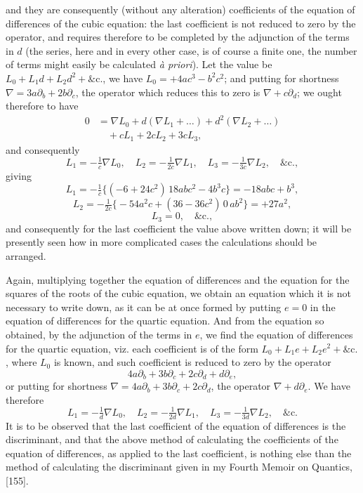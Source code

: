 \documentclass[11pt]{article}
\begin{document}
\medskip

\noindent and they are consequently (without any alteration) coefficients of the equation of differences of the cubic equation: the last coefficient is not reduced to zero by the operator, and requires therefore to be completed by the adjunction of the terms in $d$ (the series, here and in every other case, is of course a finite one, the number of terms might easily be calculated \textit{\`a priori}). Let the value be $L_0 + L_1 d + L_2 d^2 + \&\text{c.}$, we have $L_0 = +4ac^3 - b^2 c^2$; and putting for shortness $\nabla = 3a\partial_b + 2b\partial_c$, the operator which reduces this to zero is $\nabla + c\partial_d$; we ought therefore to have
\[
\begin{aligned}
  0 &= \nabla L_0 + d(\nabla L_1 + \ldots) + d^2(\nabla L_2 + \ldots)\\
    &\quad + cL_1 + 2cL_2 + 3cL_3,
\end{aligned}
\]
and consequently
\[
  L_1 = -\tfrac{1}{c}\nabla L_0,\quad L_2 = -\tfrac{1}{2c}\nabla L_1,\quad L_3 = -\tfrac{1}{3c}\nabla L_2,\quad \&\text{c.},
\]
giving
\[
  L_1 = -\tfrac{1}{c}\bigl\{(-6 + 24c^2)\,18 abc^2 - 4 b^3 c\bigr\} = -18abc + b^3,
\]
\[
  L_2 = -\tfrac{1}{2c}\bigl\{-54a^2 c + (36 - 36c^2)\,0\,ab^2\bigr\} = +27 a^2,
\]
\[
  L_3 = 0,\quad \&\text{c.},
\]
and consequently for the last coefficient the value above written down; it will be presently seen how in more complicated cases the calculations should be arranged.

\medskip

\noindent Again, multiplying together the equation of differences and the equation for the squares of the roots of the cubic equation, we obtain an equation which it is not necessary to write down, as it can be at once formed by putting $e = 0$ in the equation of differences for the quartic equation. And from the equation so obtained, by the adjunction of the terms in $e$, we find the equation of differences for the quartic equation, viz. each coefficient is of the form $L_0 + L_1 e + L_2 e^2 + \&\text{c.}$, where $L_0$ is known, and such coefficient is reduced to zero by the operator
\[
  4a\partial_b + 3b\partial_c + 2c\partial_d + d\partial_e,
\]
or putting for shortness $\nabla = 4a\partial_b + 3b\partial_c + 2c\partial_d$, the operator $\nabla + d\partial_e$. We have therefore
\[
  L_1 = -\tfrac{1}{d}\nabla L_0,\quad L_2 = -\tfrac{1}{2d}\nabla L_1,\quad L_3 = -\tfrac{1}{3d}\nabla L_2,\quad \&\text{c.}
\]
It is to be observed that the last coefficient of the equation of differences is the discriminant, and that the above method of calculating the coefficients of the equation of differences, as applied to the last coefficient, is nothing else than the method of calculating the discriminant given in my Fourth Memoir on Quantics, [155].
\end{document}
